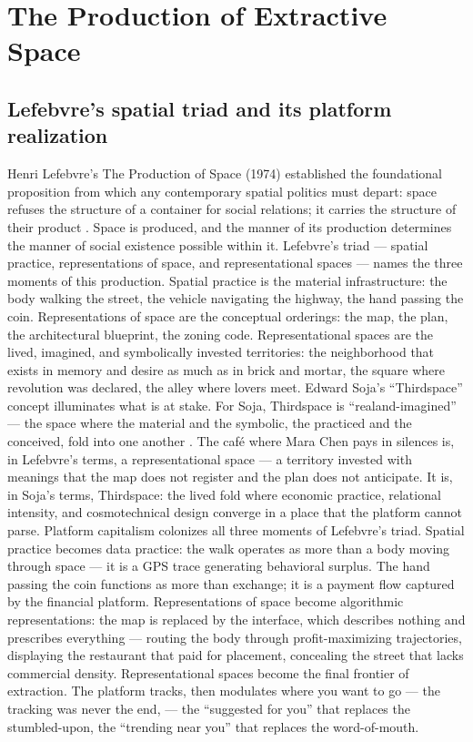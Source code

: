 \section{The Production of Extractive Space}

\subsection{Lefebvre’s spatial triad and its platform realization}

Henri Lefebvre’s The Production of Space (1974) established the foundational proposition from which any contemporary spatial politics must depart: space refuses the structure of a container for social relations; it carries the structure of their product \cite[pp.~26--33]{lefebvre_1991}. Space is produced, and the manner of its production determines the manner of social existence possible within it. Lefebvre’s triad — spatial practice, representations of space, and representational spaces — names the three moments of this production. Spatial practice is the material infrastructure: the body walking the street, the vehicle navigating the highway, the hand passing the coin. Representations of space are the conceptual orderings: the map, the plan, the architectural blueprint, the zoning code. Representational spaces are the lived, imagined, and symbolically invested territories: the neighborhood that exists in memory and desire as much as in brick and mortar, the square where revolution was declared, the alley where lovers meet. Edward Soja’s “Thirdspace” concept illuminates what is at stake. For Soja, Thirdspace is “realand-imagined” — the space where the material and the symbolic, the practiced and the conceived, fold into one another \cite[pp.~56--82]{soja_1996}. The café where Mara Chen pays in silences is, in Lefebvre’s terms, a representational space — a territory invested with meanings that the map does not register and the plan does not anticipate. It is, in Soja’s terms, Thirdspace: the lived fold where economic practice, relational intensity, and cosmotechnical design converge in a place that the platform cannot parse. Platform capitalism colonizes all three moments of Lefebvre’s triad. Spatial practice becomes data practice: the walk operates as more than a body moving through space — it is a GPS trace generating behavioral surplus. The hand passing the coin functions as more than exchange; it is a payment flow captured by the financial platform. Representations of space become algorithmic representations: the map is replaced by the interface, which describes nothing and prescribes everything — routing the body through profit-maximizing trajectories, displaying the restaurant that paid for placement, concealing the street that lacks commercial density. Representational spaces become the final frontier of extraction. The platform tracks, then modulates where you want to go — the tracking was never the end, — the “suggested for you” that replaces the stumbled-upon, the “trending near you” that replaces the word-of-mouth.

